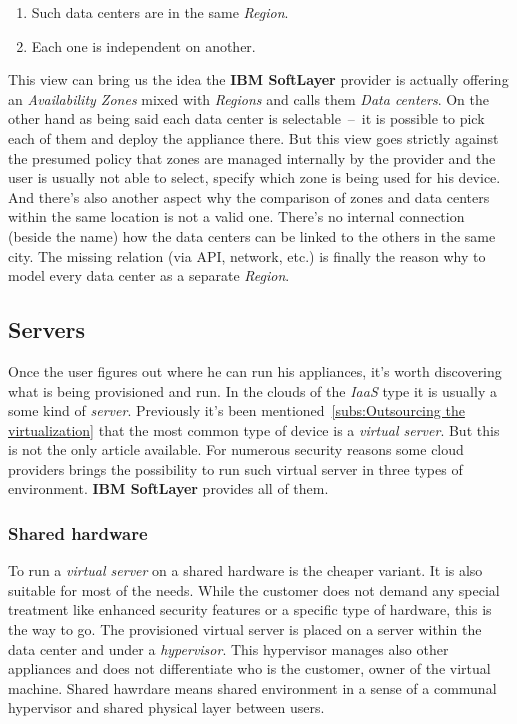 \begin{enumerate}
	\item Such data centers are in the same \emph{Region}.
	\item Each one is independent on another.
\end{enumerate}

This view can bring us the idea the \textbf{IBM SoftLayer} provider is actually offering an \emph{Availability Zones} mixed with \emph{Regions} and calls them \emph{Data centers}. On the other hand as being said each data center is selectable \,--\, it is possible to pick each of them and deploy the appliance there. But this view goes strictly against the presumed policy that zones are managed internally by the provider and the user is usually not able to select, specify which zone is being used for his device. And there's also another aspect why the comparison of zones and data centers within the same location is not a valid one. There's no internal connection (beside the name) how the data centers can be linked to the others in the same city. The missing relation (via API, network, etc.) is finally the reason why to model every data center as a separate \emph{Region}.

\subsection{Servers}
\label{sub:Servers}

Once the user figures out where he can run his appliances, it's worth discovering what is being provisioned and run. In the clouds of the \emph{IaaS} type it is usually a some kind of \emph{server}. Previously it's been mentioned~\ref{subs:Outsourcing the virtualization} that the most common type of device is a \emph{virtual server}. But this is not the only article available. For numerous security reasons some cloud providers brings the possibility to run such virtual server in three types of environment. \textbf{IBM SoftLayer} provides all of them.

\subsubsection{Shared hardware}
\label{subs:Shared hardware}

To run a \emph{virtual server} on a shared hardware is the cheaper variant. It is also suitable for most of the needs. While the customer does not demand any special treatment like enhanced security features or a specific type of hardware, this is the way to go. The provisioned virtual server is placed on a server within the data center and under a \emph{hypervisor}. This hypervisor manages also other appliances and does not differentiate who is the customer, owner of the virtual machine. Shared hawrdare means shared environment in a sense of a communal hypervisor and shared physical layer between users.

